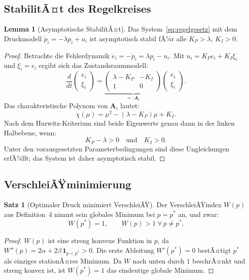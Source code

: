 ﻿\documentclass[a4paper,12pt]{article}
\theoremstyle{definition}
\newtheorem{satz}{Satz}
\newtheorem{lemma}{Lemma}
\begin{document}
\subsection{StabilitÃ¤t des Regelkreises}

\begin{lemma}[Asymptotische StabilitÃ¤t]
\label{lem:stabilitaet}
Das System~\eqref{eq:regelgesetz} mit dem Druckmodell
$\dot{p}_i = -\lambda p_i + u_i$ ist asymptotisch stabil fÃ¼r alle
$K_P > \lambda$, $K_I > 0$.
\end{lemma}

\begin{proof}
Betrachte die Fehlerdynamik $\dot{e}_i = -\dot{p}_i = \lambda p_i - u_i$.
Mit $u_i = K_P e_i + K_I \xi_i$ und $\dot{\xi}_i = e_i$ ergibt sich das
Zustandsraummodell:
\[
    \frac{d}{dt}\begin{pmatrix} e_i \\ \xi_i \end{pmatrix}
    = \underbrace{\begin{pmatrix} \lambda - K_P & -K_I \\ 1 & 0 \end{pmatrix}}_{=: \mathbf{A}_i}
    \begin{pmatrix} e_i \\ \xi_i \end{pmatrix}.
\]
Das charakteristische Polynom von $\mathbf{A}_i$ lautet:
\[
    \chi(\mu) = \mu^2 - (\lambda - K_P)\mu + K_I.
\]
Nach dem Hurwitz-Kriterium sind beide Eigenwerte genau dann in der linken
Halbebene, wenn:
\[
    K_P - \lambda > 0 \quad \text{und} \quad K_I > 0.
\]
Unter den vorausgesetzten Parameterbedingungen sind diese Ungleichungen
erfÃ¼llt; das System ist daher asymptotisch stabil.
\end{proof}

\subsection{VerschleiÃŸminimierung}

\begin{satz}[Optimaler Druck minimiert VerschleiÃŸ]
\label{satz:optimaldruck}
Der VerschleiÃŸindex $W(p)$ aus Definition~4 nimmt sein globales Minimum bei
$p = p^*$ an, und zwar:
\[
    W(p^*) = 1, \qquad W(p) > 1 \;\forall\, p \neq p^*.
\]
\end{satz}

\begin{proof}
$W(p)$ ist eine streng konvexe Funktion in $p$, da
$W''(p) = 2\alpha + 2\beta\,\mathbf{1}_{p < p^*} > 0$.
Die erste Ableitung $W'(p^*) = 0$ bestÃ¤tigt $p^*$ als einziges stationÃ¤res
Minimum. Da $W$ nach unten durch $1$ beschrÃ¤nkt und streng konvex ist, ist
$W(p^*) = 1$ das eindeutige globale Minimum.
\end{proof}
\end{document}
